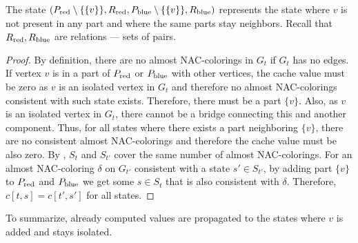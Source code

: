 %
The state \( (P_{\text{red}} \setminus \{\{v\}\}, R_{\text{red}}, P_{\text{blue}} \setminus \{\{v\}\}, R_{\text{blue}}) \)
represents the state where \( v \) is not present in any part
and where the same parts stay neighbors.
Recall that \( R_{\text{red}}, R_{\text{blue}} \) are relations --- sets of pairs.
%
\begin{proof}
	By definition, there are no almost NAC-colorings
	in \( G_t \) if \( G_t \) has no edges.
	If vertex \( v \) is in a part of \( P_{\text{red}} \) or \( P_{\text{blue}} \) with other vertices,
	the cache value must be zero as \( v \) is an isolated vertex in \( G_t \)
	and therefore no almost NAC-colorings consistent with such state exists.
	Therefore, there must be a part \( \{v\} \).
	Also, as \( v \) is an isolated vertex in \( G_t \), there cannot be a bridge
	connecting this and another component.
	Thus, for all states where there exists
	a part neighboring \( \{v\} \), there are no consistent almost NAC-colorings
	and therefore the cache value must be also zero.
	By ,
	\( S_t \) and \( S_{t'} \) cover the same number of almost NAC-colorings.
	For an almost NAC-coloring \( \delta \) on \( G_{t'} \) consistent with
	a state \( s' \in S_{t'} \),
	by adding part \( \{v\} \) to \( P_{\text{red}} \) and \( P_{\text{blue}} \)
	we get some \( s \in S_t \) that is also consistent with \( \delta \).
	Therefore, \( c[t, s] = c[t', s'] \) for all states.
\end{proof}
%
To summarize, already computed values are propagated to the states
where \( v \) is added and stays isolated.

